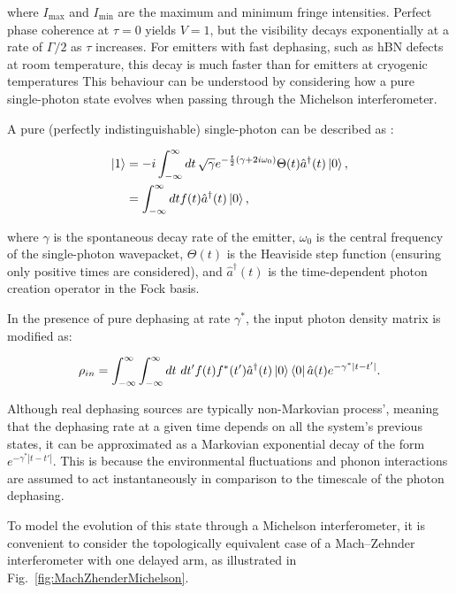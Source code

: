 where $I_\text{max}$ and $I_\text{min}$ are the maximum and minimum fringe intensities. Perfect phase coherence at $\tau=0$ yields $V=1$, but the visibility decays exponentially at a rate of $\Gamma/2$ as $\tau$ increases. For emitters with fast dephasing, such as hBN defects at room temperature, this decay is much faster than for emitters at cryogenic temperatures This behaviour can be understood by considering how a pure single-photon state evolves when passing through the Michelson interferometer.

A pure (perfectly indistinguishable) single-photon can be described as \cite{Maffei2021}:

\begin{equation}
\begin{aligned}
    \ket{1} & = -i\int_{-\infty}^{\infty} dt\, \sqrt{\gamma} e^{-\frac{t}{2}(\gamma+2i\omega_0)} \Theta(t) \hat{a}^{\dagger}(t) \ket{0}, \\
    & = \int_{-\infty}^{\infty} dt f(t) \hat{a}^{\dagger}(t) \ket{0},
    \label{eqn:wavepacket}
\end{aligned}
\end{equation}

where $\gamma$ is the spontaneous decay rate of the emitter, $\omega_0$ is the central frequency of the single-photon wavepacket, $\Theta(t)$ is the Heaviside step function (ensuring only positive times are considered), and $\hat{a}^{\dagger}(t)$ is the time-dependent photon creation operator in the Fock basis. 

In the presence of pure dephasing at rate $\gamma^*$, the input photon density matrix is modified as:

\begin{equation}
    \rho_{in} = \int_{-\infty}^{\infty}\int_{-\infty}^{\infty}dt \ dt' f(t)f^*(t') \hat{a}^{\dagger}(t) \ket{0} \bra{0} \hat{a}(t) e^{-\gamma^*|t-t'|}.
\end{equation}

Although real dephasing sources are typically non-Markovian process', meaning that the dephasing rate at a given time depends on all the system's previous states, it can be approximated as a Markovian exponential decay of the form $e^{-\gamma^*|t-t'|}$. This is because the environmental fluctuations and phonon interactions are assumed to act instantaneously in comparison to the timescale of the photon dephasing.

To model the evolution of this state through a Michelson interferometer, it is convenient to consider the topologically equivalent case of a Mach–Zehnder interferometer with one delayed arm, as illustrated in Fig.~\ref{fig:MachZhenderMichelson}. 


